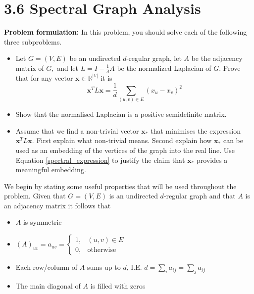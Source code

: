 \section*{3.6 Spectral Graph Analysis}
\begin{tcolorbox}
  \textbf{Problem formulation:} In this problem, you should solve each of the following three subproblems.

  \begin{itemize}
    \item Let $G=(V, E)$ be an undirected $d$-regular graph, let $A$ be the adjacency matrix of $G,$ and let $L=I-\frac{1}{d} A$ be the normalized Laplacian of $G .$ Prove that for any vector $\mathbf{x} \in \mathbb{R}^{|V|}$ it is
    \begin{equation}
      \mathbf{x}^{T} L \mathbf{x}=\frac{1}{d} \sum_{(u, v) \in E}\left(x_{u}-x_{v}\right)^{2}
      \label{spectral_expression}
    \end{equation}
    \item Show that the normalised Laplacian is a positive semidefinite matrix.
    \item Assume that we find a non-trivial vector $\mathbf{x}_{*}$ that minimises the expression $\mathbf{x}^{T} L \mathbf{x} .$ First explain what non-trivial means. Second explain how $\mathbf{x}_{*}$ can be used as an embedding of the vertices of the graph into the real line. Use Equation \eqref{spectral_expression} to justify the claim that $\mathbf{x}_{*}$ provides a meaningful embedding.
  \end{itemize}
\end{tcolorbox}

We begin by stating some useful properties that will be used throughout the problem. Given that $G=(V, E)$ is an undirected $d$-regular graph and that $A$ is an adjacency matrix it follows that

\begin{itemize}
  \item $A$ is symmetric
  \item $(A)_{uv} = a_{uv} = \begin{cases} 1, & (u,v) \in E \\ 0, & \text{otherwise}\end{cases}$
  \item Each row/column of $A$ sums up to $d$, I.E. $d = \sum_i{a_{ij}} = \sum_j{a_{ij}}$
  \item The main diagonal of $A$ is filled with zeros

\end{itemize}

